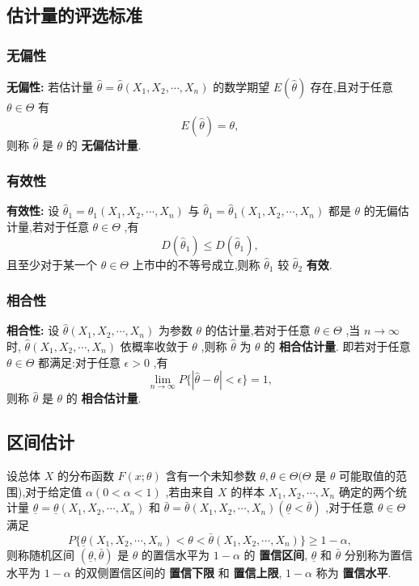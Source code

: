 \documentclass[UTF8,10pt]{ctexart}
\begin{document}
	\subsection{估计量的评选标准}
	
	\subsubsection{无偏性}
	
	\textbf{无偏性:} 若估计量 $ \hat{ \theta } = \hat{ \theta } (X_{1},X_{2}, \cdots ,X_{n}) $ 的数学期望 $ E( \hat{ \theta } ) $ 存在,且对于任意 $ \theta \in \Theta $ 有 $$ E( \hat{ \theta } )= \theta , $$ 则称 $ \hat{ \theta } $ 是 $ \theta $ 的 \textbf{无偏估计量}.
	
	\subsubsection{有效性}
	
	\textbf{有效性:} 设 $ \hat{ \theta } _{1} = \hat{ \theta} _{1} (X_{1},X_{2}, \cdots ,X_{n}) $ 与 $ \hat{ \theta } _{1} = \hat{ \theta } _{1} (X_{1},X_{2}, \cdots ,X_{n}) $ 都是 $ \theta $ 的无偏估计量,若对于任意 $ \theta \in \Theta $ ,有 $$ D( \hat{ \theta } _{1} ) \le D( \hat{ \theta } _{1} ), $$ 且至少对于某一个 $ \theta \in \Theta $ 上市中的不等号成立,则称 $ \hat{ \theta } _{1} $ 较 $ \hat{ \theta } _{2} $ \textbf{有效}.
	
	\subsubsection{相合性}
	
	\textbf{相合性:} 设 $ \hat{ \theta } (X_{1},X_{2}, \cdots ,X_{n}) $ 为参数 $ \theta $ 的估计量,若对于任意 $ \theta \in \Theta $ ,当 $ n \to \infty $ 时, $ \hat{ \theta } (X_{1},X_{2}, \cdots ,X_{n}) $ 依概率收敛于 $ \theta $ ,则称 $ \hat{ \theta } $ 为 $ \theta $ 的 \textbf{相合估计量}. 即若对于任意 $ \theta \in \Theta $ 都满足:对于任意 $ \epsilon >0 $ ,有 $$ \lim\limits_{n \to \infty }P\{| \hat{ \theta } - \theta |< \epsilon \}=1, $$ 则称 $ \hat{ \theta } $ 是 $ \theta $ 的 \textbf{相合估计量}.
	
	\subsection{区间估计}
	
	设总体 $ X $ 的分布函数 $ F(x; \theta ) $ 含有一个未知参数 $ \theta , \theta \in \Theta ( \Theta  $ 是 $ \theta $ 可能取值的范围),对于给定值 $ \alpha (0< \alpha <1) $ ,若由来自 $ X $ 的样本 $ X_{1},X_{2}, \cdots ,X_{n} $ 确定的两个统计量 $ \underline{ \theta } = \underline{ \theta } (X_{1},X_{2}, \cdots ,X_{n}) $ 和 $ \bar{ \theta } = \bar{ \theta } (X_{1},X_{2}, \cdots ,X_{n})( \underline{ \theta } < \bar{ \theta } ) $ ,对于任意 $ \theta \in \Theta $ 满足 $$ P\{ \underline{ \theta } (X_{1},X_{2}, \cdots ,X_{n})< \theta < \bar{ \theta } (X_{1},X_{2}, \cdots ,X_{n}) \} \ge 1 - \alpha , $$ 则称随机区间 $ (\underline{ \theta } , \bar{ \theta } ) $ 是 $ \theta $ 的置信水平为 $ 1- \alpha $ 的 \textbf{置信区间}, $ \underline{ \theta } $ 和 $ \bar{ \theta } $ 分别称为置信水平为 $ 1- \alpha $ 的双侧置信区间的 \textbf{置信下限} 和 \textbf{置信上限}, $ 1- \alpha $ 称为 \textbf{置信水平}.
	
\end{document}
